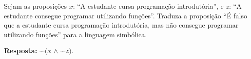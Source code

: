 \documentclass{ufcdocument}
\begin{document}
\def\course{Lógica para Ciência da Computação}
\def\prof{Esdras Lins Bispo Jr.}
\def\semester{2026.1}
\def\codeCourse{ICE0239}
\def\registration{}
\def\student{}
\def\graduate{Bacharelado em Ciência da Computação}
\def\theme{Avaliação da Competência LCC C1.2:\\ \texttt{Conversão da linguagem natural para simbólica.}\\
07 de abril de 2026
}
    \makeheader
    
    \vspace{0.5cm}
    
     \begin{question}
        \item Sejam as proposições $x$: ``A estudante cursa programação introdutória'', e $z$: ``A estudante consegue programar utilizando funções''. Traduza  a proposição ``É falso que a estudante cursa programação introdutória, mas não consegue programar utilizando funções'' para a linguagem simbólica.
    \end{question}

    \vspace{0.3cm}
        
    {\color{blue} {\bf Resposta:} $\sim (x$ $\wedge$ $\sim z)$.}
 
    \vfill
\end{document}
